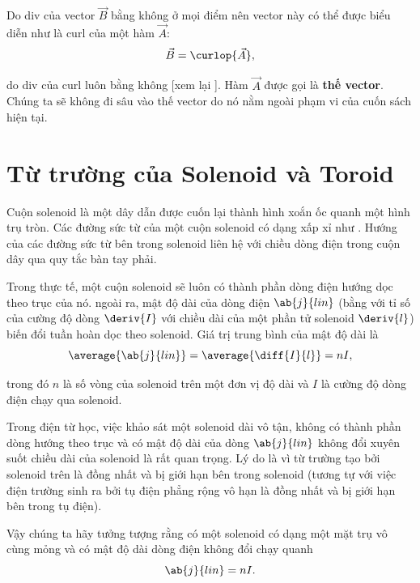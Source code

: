 Do div của vector $\vec{B}$ bằng không ở mọi điểm nên vector này có thể được biểu diễn như là curl của một hàm $\vec{A}$:
\begin{equation}\label{eq:6_104}
    \vec{B} = \curlop{\vec{A}},
\end{equation}

\noindent
do div của curl luôn bằng không [xem lại ]. Hàm $\vec{A}$ được gọi là \textbf{thế vector}. Chúng ta sẽ không đi sâu vào thế vector do nó nằm ngoài phạm vi của cuốn sách hiện tại.

\section{Từ trường của Solenoid và Toroid}\label{sec:6_12}

Cuộn solenoid là một dây dẫn được cuốn lại thành hình xoắn ốc quanh một hình trụ tròn. Các đường sức từ của một cuộn solenoid có dạng xấp xỉ như . Hướng của các đường sức từ bên trong solenoid liên hệ với chiều dòng điện trong cuộn dây qua quy tắc bàn tay phải.

Trong thực tế, một cuộn solenoid sẽ luôn có thành phần dòng điện hướng dọc theo trục của nó. ngoài ra, mật độ dài của dòng điện $\ab{j}{lin}$ (bằng với tỉ số của cường độ dòng $\deriv{I}$ với chiều dài của một phần tử solenoid $\deriv{l}$) biến đổi tuần hoàn dọc theo solenoid. Giá trị trung bình của mật độ dài là
\begin{equation}\label{eq:6_105}
    \average{\ab{j}{lin}} = \average{\diff{I}{l}} = nI,
\end{equation}

\noindent
trong đó $n$ là số vòng của solenoid trên một đơn vị độ dài và $I$ là cường độ dòng điện chạy qua solenoid.

Trong điện từ học, việc khảo sát một solenoid dài vô tận, không có thành phần dòng hướng theo trục và có mật độ dài của dòng $\ab{j}{lin}$ không đổi xuyên suốt chiều dài của solenoid là rất quan trọng. Lý do là vì từ trường tạo bởi solenoid trên là đồng nhất và bị giới hạn bên trong solenoid (tương tự với việc điện trường sinh ra bởi tụ điện phẳng rộng vô hạn là đồng nhất và bị giới hạn bên trong tụ điện).

Vậy chúng ta hãy tưởng tượng rằng có một solenoid có dạng một mặt trụ vô cùng mỏng và có mật độ dài dòng điện không đổi chạy quanh
\begin{equation}\label{eq:6_106}
    \ab{j}{lin} = nI.
\end{equation}

